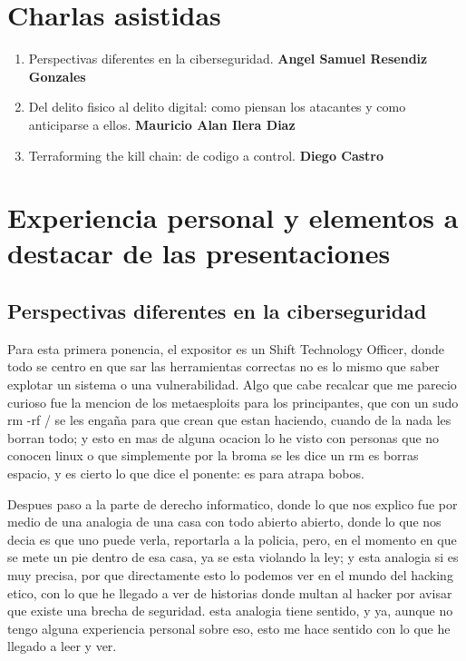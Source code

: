 \documentclass[letterpaper,12pt]{article}
\begin{document}


\newpage

{\hypersetup{linkcolor=black}\tableofcontents}
\thispagestyle{estiloindice}


\newpage

\thispagestyle{fancy}
\setcounter{page}{1}
\singlespacing

\section{Charlas asistidas}

\begin{enumerate}
  \item Perspectivas diferentes en la ciberseguridad. \textbf{Angel Samuel Resendiz Gonzales}
  \item Del delito fisico al delito digital: como piensan los atacantes y como anticiparse a ellos. \textbf{Mauricio Alan Ilera Diaz}
  \item Terraforming the kill chain: de codigo a control. \textbf{Diego Castro}
\end{enumerate}

\section{Experiencia personal y elementos a destacar de las presentaciones}

\subsection{Perspectivas diferentes en la ciberseguridad}

Para esta primera ponencia, el expositor es un Shift Technology
Officer, donde todo se centro en que sar las herramientas
correctas no es lo mismo que saber explotar un sistema o una vulnerabilidad.
Algo que cabe recalcar que me parecio curioso fue la mencion de los 
metaesploits para los principantes, que con un sudo rm -rf /
se les engaña para que crean que estan haciendo, cuando de la nada les borran todo;
y esto en mas de alguna ocacion lo he visto con personas 
que no conocen linux o que simplemente por la broma se les dice un rm es borras 
espacio, y es cierto lo que dice el ponente: es para atrapa bobos.

Despues paso a la parte de derecho informatico, donde lo que nos explico 
fue por medio de una
analogia de una casa con todo abierto abierto, donde lo que nos decia es que uno puede
verla, reportarla a la policia, pero, en el
momento en que se mete un pie dentro de esa casa, ya se esta violando la ley; y esta 
analogia si es muy precisa, por que directamente esto lo podemos ver 
en el mundo del hacking etico, con lo que he llegado a ver de historias 
donde multan al hacker por avisar que existe una brecha de seguridad.
esta analogia tiene sentido, y ya, aunque no tengo alguna experiencia 
personal sobre eso, esto me hace sentido con lo que he llegado 
a leer y ver.
\end{document}
